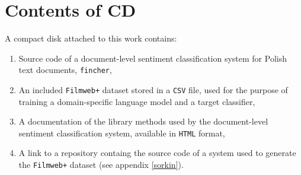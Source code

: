 \chapter{Contents of CD}
\label{plytaCD}

A compact disk attached to this work contains:

\begin{enumerate}
    \item Source code of a document-level sentiment classification system for Polish text documents, \lstinline{fincher},
    \item An included \lstinline{Filmweb+} dataset stored in a \lstinline{CSV} file, used for the purpose of training a domain-specific language model and a target classifier,
    \item A documentation of the library methods used by the document-level sentiment classification system, available in \lstinline{HTML} format,
    \item A link to a repository containg the source code of a system used to generate the \lstinline{Filmweb+} dataset (see appendix \ref{sorkin}).
\end{enumerate}
